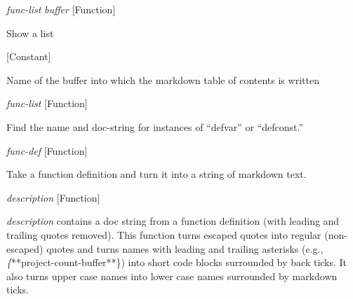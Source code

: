 \vspace{1em}
\noindent
{}
\usebox{\funcname}\emph{func-list} \emph{buffer}
 \hfill [Function]

\begin{doc-string}
Show a list
\end{doc-string}

\vspace{1em}
\noindent
{}
\usebox{\funcname}
 \hfill [Constant]

\begin{doc-string}
Name of the buffer into which the markdown table of contents is written
\end{doc-string}

\vspace{1em}
\noindent
{}
\usebox{\funcname}\emph{func-list}
 \hfill [Function]

\begin{doc-string}
Find the name and doc-string for instances of ``defvar'' or ``defconst.''
\end{doc-string}

\vspace{1em}
\noindent
{}
\usebox{\funcname}\emph{func-def}
 \hfill [Function]

\begin{doc-string}
Take a function definition and turn it into a string of markdown text.
\end{doc-string}

\vspace{1em}
\noindent
{}
\usebox{\funcname}\emph{description}
 \hfill [Function]

\begin{doc-string}
\emph{description} contains a doc string from a function definition (with leading
and trailing quotes removed).  This function turns escaped quotes into regular
(non-escaped) quotes and turns names with leading and trailing asterisks (e.g.,
\emph\{**project-count-buffer**\}) into short code blocks surrounded by back ticks.  It also
turns upper case names into lower case names surrounded by markdown ticks.
\end{doc-string}

